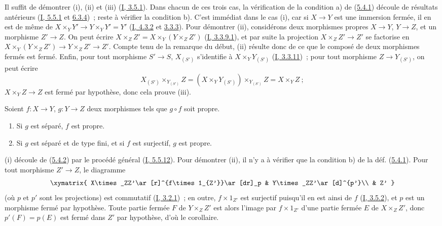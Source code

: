 
Il suffit de démontrer (i), (ii) et (iii) (\hyperref[I.3.5.1-fr]{I, 3.5.1}).
Dans chacun de ces trois cas, la vérification de la condition a) de
(\hyperref[II.5.4.1-fr]{5.4.1}) découle de résultats antérieurs
(\hyperref[I.5.5.1-fr]{I, 5.5.1} et \hyperref[I.6.3.4-fr]{6.3.4})~; reste à
vérifier la condition b). C'est immédiat dans le cas (i), car si $X\to Y$
est une immersion fermée, il en est de même de
$X\times_YY'\to Y\times_YY'=Y'$ (\hyperref[I.4.3.2-fr]{I, 4.3.2} et
\hyperref[II.3.3.3-fr]{3.3.3}). Pour démontrer (ii), considérons deux
morphismes propres $X\to Y$, $Y\to Z$, et un morphisme $Z'\to Z$. On peut
écrire $X\times_ZZ'=X\times_Y(Y\times_ZZ')$
(\hyperref[I.3.3.9.1-fr]{I, 3.3.9.1}), et par suite la projection
$X\times_ZZ'\to Z'$ se factorise en
$X\times_Y(Y\times_ZZ')\to Y\times_ZZ'\to Z'$. Compte tenu de la remarque
du début, (ii) résulte donc de ce que le composé de deux morphismes fermés
est fermé. Enfin, pour tout morphisme $S'\to S$, $X_{(S')}$ s'identifie à
$X\times_YY_{(S')}$ (\hyperref[I.3.3.11-fr]{I, 3.3.11})~; pour tout
morphisme $Z\to Y_{(S')}$, on peut écrire
\[
  X_{(S')}\times_{Y_{(S')}}Z
  =(X\times_YY_{(S')})\times_{Y_{(S')}}Z=X\times_YZ~;
\]
$X\times_YZ\to Z$ est fermé par hypothèse, donc cela prouve (iii).

\begin{corollary}[5.4.3]
\label{II.5.4.3-fr}
Soient $f:X\to Y$, $g:Y\to Z$ deux morphismes tels que $g\circ f$ soit
propre.
\begin{enumerate}
  \item[\rm{(i)}] Si $g$ est séparé, $f$ est propre.
  \item[\rm{(ii)}] Si $g$ est séparé et de type fini, et si $f$ est
  surjectif, $g$ est propre.
\end{enumerate}
\end{corollary}

(i) découle de (\hyperref[II.5.4.2-fr]{5.4.2}) par le procédé général
(\hyperref[I.5.5.12-fr]{I, 5.5.12}). Pour démontrer (ii), il n'y a à
vérifier que la condition b) de la déf. (\hyperref[II.5.4.1-fr]{5.4.1}).
Pour tout morphisme $Z'\to Z$, le diagramme
\[
  \xymatrix{
    X\times_ZZ'\ar[r]^{f\times1_{Z'}}\ar[dr]_p &
    Y\times_ZZ'\ar[d]^{p'}\\
    & Z'
  }
\]
(où $p$ et $p'$ sont les projections) est commutatif
(\hyperref[I.3.2.1-fr]{I, 3.2.1})~; en outre, $f\times1_{Z'}$ est surjectif
puisqu'il en est ainsi de $f$ (\hyperref[I.3.5.2-fr]{I, 3.5.2}), et $p$ est
un morphisme fermé par hypothèse. Toute partie fermée $F$ de
$Y\times_ZZ'$ est alors l'image par $f\times1_{Z'}$ d'une partie fermée $E$
de $X\times_ZZ'$, donc $p'(F)=p(E)$ est fermé dans $Z'$ par hypothèse, d'où
le corollaire.

